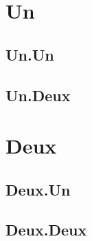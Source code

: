 \documentclass{article}
\begin{document}
\section{Un}
\subsection{Un.Un}
\subsection{Un.Deux}
\section{Deux}
\subsection{Deux.Un}
\subsection{Deux.Deux}
\end{document}
